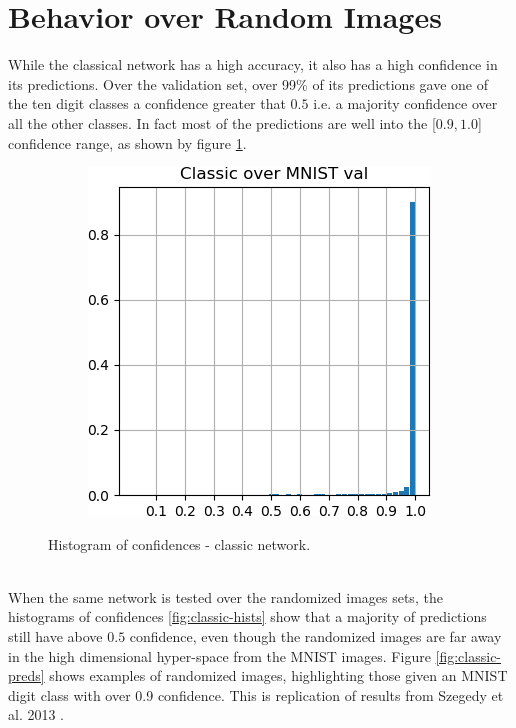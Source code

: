 \documentclass[12pt,oneside]{CUNY_PhD}
\begin{document}
\section{Behavior over Random Images}
While the classical network has a high accuracy, it also has a high confidence in its predictions. Over the validation set, over 99\% of its predictions gave one of the ten digit classes a confidence greater that $0.5$ i.e. a majority confidence over all the other classes. In fact most of the predictions are well into the [$0.9,1.0$] confidence range, as shown by figure \ref{fig:classic-mnist}.
\begin{figure}[!h]
    \centering
    \begin{subfigure}[t]{0.49\textwidth}
        \includegraphics[width=\textwidth]{images/mnist-behavior/classic-hist-val.png}
    \end{subfigure}
    \caption{Histogram of confidences - classic network.}
    \label{fig:classic-mnist}
\end{figure}\\
When the same network is tested over the randomized images sets, the histograms of confidences  \ref{fig:classic-hists} show that a majority of predictions still have above $0.5$ confidence, even though the randomized images are far away in the high dimensional hyper-space from the MNIST images. Figure \ref{fig:classic-preds} shows examples of randomized images, highlighting those given an MNIST digit class with over 0.9 confidence. This is replication of results from Szegedy et al. 2013 \cite{szegedy2013intriguing}.
\end{document}
